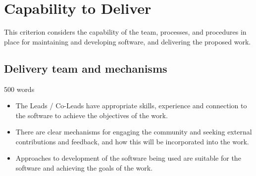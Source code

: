 \documentclass[12pt]{article}
\newenvironment{instruction}{%
    \begin{tcolorbox}[breakable,colback=red!5,colframe=red,title=Instruction]%
	}{%
    	\end{tcolorbox}%
	}
\begin{document}


\pagebreak

\section{Capability to Deliver}

\begin{instruction}

    This criterion considers the capability of the team, processes, and
    procedures in place for maintaining and developing software, and delivering
    the proposed work.

\end{instruction}

\subsection{Delivery team and mechanisms}

\begin{instruction}

    500 words

    \begin{itemize}

        \item The Leads / Co-Leads have appropriate skills, experience and
            connection to the software to achieve the objectives of the work.

        \item There are clear mechanisms for engaging the community and seeking
            external contributions and feedback, and how this will be
            incorporated into the work.

        \item Approaches to development of the software being used are suitable
            for the software and achieving the goals of the work.

    \end{itemize}

\end{instruction}





\end{document}
